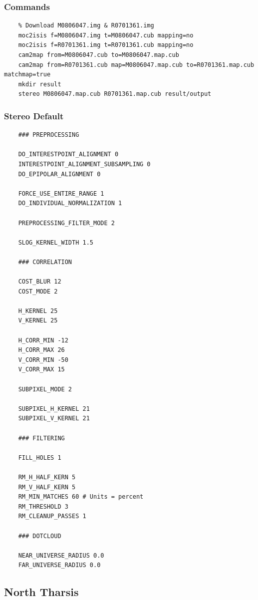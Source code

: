 \subsubsection*{Commands}

\begin{verbatim}
    % Download M0806047.img & R0701361.img
    moc2isis f=M0806047.img t=M0806047.cub mapping=no
    moc2isis f=R0701361.img t=R0701361.cub mapping=no
    cam2map from=M0806047.cub to=M0806047.map.cub
    cam2map from=R0701361.cub map=M0806047.map.cub to=R0701361.map.cub matchmap=true
    mkdir result
    stereo M0806047.map.cub R0701361.map.cub result/output
\end{verbatim}

\subsubsection*{Stereo Default}

\begin{verbatim}
    ### PREPROCESSING

    DO_INTERESTPOINT_ALIGNMENT 0
    INTERESTPOINT_ALIGNMENT_SUBSAMPLING 0
    DO_EPIPOLAR_ALIGNMENT 0

    FORCE_USE_ENTIRE_RANGE 1
    DO_INDIVIDUAL_NORMALIZATION 1

    PREPROCESSING_FILTER_MODE 2

    SLOG_KERNEL_WIDTH 1.5

    ### CORRELATION

    COST_BLUR 12
    COST_MODE 2

    H_KERNEL 25
    V_KERNEL 25

    H_CORR_MIN -12
    H_CORR_MAX 26
    V_CORR_MIN -50
    V_CORR_MAX 15

    SUBPIXEL_MODE 2

    SUBPIXEL_H_KERNEL 21
    SUBPIXEL_V_KERNEL 21

    ### FILTERING

    FILL_HOLES 1

    RM_H_HALF_KERN 5
    RM_V_HALF_KERN 5
    RM_MIN_MATCHES 60 # Units = percent
    RM_THRESHOLD 3
    RM_CLEANUP_PASSES 1

    ### DOTCLOUD

    NEAR_UNIVERSE_RADIUS 0.0
    FAR_UNIVERSE_RADIUS 0.0
\end{verbatim}

\subsection{North Tharsis}

